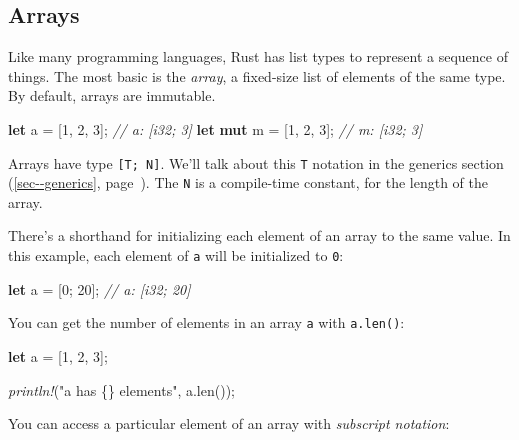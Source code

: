 \documentclass[a4paper,]{book}
\renewcommand*{\hypertarget}[3][\ar]{%
  \def\ar{#2}%
  \label{#1}%
  #3}
\renewcommand*{\hyperlink}[2]{%
 #2 (\autoref{#1}, page~\pageref{#1})}
\newenvironment{Shaded}{\begin{snugshade}}{\end{snugshade}}
\newcommand{\KeywordTok}[1]{\textcolor[rgb]{0.13,0.29,0.53}{\textbf{{#1}}}}
\newcommand{\DecValTok}[1]{\textcolor[rgb]{0.00,0.00,0.81}{{#1}}}
\newcommand{\StringTok}[1]{\textcolor[rgb]{0.31,0.60,0.02}{{#1}}}
\newcommand{\CommentTok}[1]{\textcolor[rgb]{0.56,0.35,0.01}{\textit{{#1}}}}
\newcommand{\PreprocessorTok}[1]{\textcolor[rgb]{0.56,0.35,0.01}{\textit{{#1}}}}
\newcommand{\NormalTok}[1]{{#1}}
\begin{document}
\hypertarget{arrays}{\subsection{Arrays}\label{arrays}}

Like many programming languages, Rust has list types to represent a
sequence of things. The most basic is the \emph{array}, a fixed-size
list of elements of the same type. By default, arrays are immutable.

\begin{Shaded}
\begin{Highlighting}[]
\KeywordTok{let} \NormalTok{a = [}\DecValTok{1}\NormalTok{, }\DecValTok{2}\NormalTok{, }\DecValTok{3}\NormalTok{]; }\CommentTok{// a: [i32; 3]}
\KeywordTok{let} \KeywordTok{mut} \NormalTok{m = [}\DecValTok{1}\NormalTok{, }\DecValTok{2}\NormalTok{, }\DecValTok{3}\NormalTok{]; }\CommentTok{// m: [i32; 3]}
\end{Highlighting}
\end{Shaded}

Arrays have type \texttt{{[}T;\ N{]}}. We'll talk about this \texttt{T}
notation \protect\hyperlink{sec--generics}{in the generics section}. The
\texttt{N} is a compile-time constant, for the length of the array.

There's a shorthand for initializing each element of an array to the
same value. In this example, each element of \texttt{a} will be
initialized to \texttt{0}:

\begin{Shaded}
\begin{Highlighting}[]
\KeywordTok{let} \NormalTok{a = [}\DecValTok{0}\NormalTok{; }\DecValTok{20}\NormalTok{]; }\CommentTok{// a: [i32; 20]}
\end{Highlighting}
\end{Shaded}

You can get the number of elements in an array \texttt{a} with
\texttt{a.len()}:

\begin{Shaded}
\begin{Highlighting}[]
\KeywordTok{let} \NormalTok{a = [}\DecValTok{1}\NormalTok{, }\DecValTok{2}\NormalTok{, }\DecValTok{3}\NormalTok{];}

\PreprocessorTok{println!}\NormalTok{(}\StringTok{"a has \{\} elements"}\NormalTok{, a.len());}
\end{Highlighting}
\end{Shaded}

You can access a particular element of an array with \emph{subscript
notation}:
\end{document}
